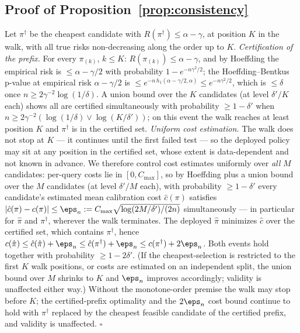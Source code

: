\subsection{Proof of Proposition~\ref{prop:consistency}}
Let $\pi^\dagger$ be the cheapest candidate with
$R(\pi^\dagger) \le \alpha - \gamma$, at position $K$ in the walk,
with all true risks non-decreasing along the order up to $K$.
\emph{Certification of the prefix.} For every $\pi_{(k)}$, $k \le K$:
$R(\pi_{(k)}) \le \alpha - \gamma$, and by Hoeffding the empirical
risk is $\le \alpha - \gamma/2$ with probability
$1 - e^{-n\gamma^2/2}$; the Hoeffding--Bentkus p-value at empirical
risk $\alpha - \gamma/2$ is
$\le e^{-n\,h_1(\alpha-\gamma/2,\alpha)} \le e^{-n\gamma^2/2}$, which
is $\le \delta$ once $n \ge 2\gamma^{-2}\log(1/\delta)$. A union bound
over the $K$ candidates (at level $\delta'/K$ each) shows all are
certified simultaneously with probability $\ge 1 - \delta'$ when
$n \ge 2\gamma^{-2}(\log(1/\delta) \vee \log(K/\delta'))$; on this
event the walk reaches at least position $K$ and $\pi^\dagger$ is in
the certified set. \emph{Uniform cost estimation.} The walk does not
stop at $K$ --- it continues until the first failed test --- so the
deployed policy may sit at any position in the certified set, whose
extent is data-dependent and not known in advance. We therefore
control cost estimates uniformly over \emph{all} $M$ candidates:
per-query costs lie in $[0, C_{\max}]$, so by Hoeffding plus a union
bound over the $M$ candidates (at level $\delta'/M$ each), with
probability $\ge 1 - \delta'$ every candidate's estimated mean
calibration cost $\hat c(\pi)$ satisfies
$|\hat c(\pi) - c(\pi)| \le \eps_n :=
C_{\max}\sqrt{\log(2M/\delta')/(2n)}$ simultaneously --- in
particular for $\hat\pi$ and $\pi^\dagger$, wherever the walk
terminates. The deployed
$\hat\pi$ minimizes $\hat c$ over the certified set, which contains
$\pi^\dagger$, hence
$c(\hat\pi) \le \hat c(\hat\pi) + \eps_n \le \hat c(\pi^\dagger) +
\eps_n \le c(\pi^\dagger) + 2\eps_n$. Both events hold together with
probability $\ge 1 - 2\delta'$. (If the cheapest-selection is
restricted to the first $K$ walk positions, or costs are estimated on
an independent split, the union bound over $M$ shrinks to $K$ and
$\eps_n$ improves accordingly; validity is unaffected either way.)
Without the monotone-order premise the
walk may stop before $K$; the certified-prefix optimality and the
$2\eps_n$ cost bound continue to hold with $\pi^\dagger$ replaced by
the cheapest feasible candidate of the certified prefix, and validity
is unaffected. \hfill$\square$

